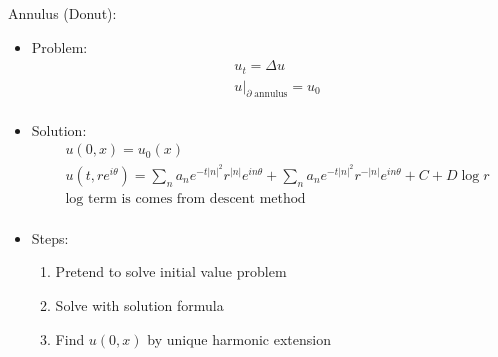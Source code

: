 \documentclass[12pt, a4paper]{article}
\begin{document}
Annulus (Donut):
\begin{itemize}
    \item Problem:
    \begin{align*}
        &u_t = \Delta u\\
        &\left.u\right\rvert_{\partial \;\text{annulus}} = u_0\\
    \end{align*}
    \item Solution:
    \begin{align*}
        &u(0, x) = u_0(x)\\
        &u(t, re^{i\theta}) = \sum_n a_n e^{-t|n|^2}r^{|n|}e^{in\theta} + \sum_n a_n e^{-t|n|^2}r^{-|n|}e^{in\theta} +  C + D\log r\\
        &\text{$\log$ term is comes from descent method}\\
    \end{align*}
    \item Steps:
    \begin{enumerate}
        \item Pretend to solve initial value problem
        \item Solve with solution formula
        \item Find $u(0, x)$ by unique harmonic extension
    \end{enumerate}
\end{itemize}
\vspace{0.3em}
\end{document}
